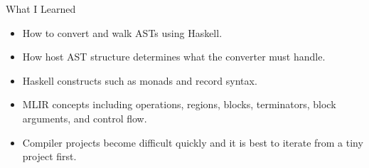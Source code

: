 \documentclass[aspectratio=169,11pt]{beamer}
\begin{document}
\begin{frame}{What I Learned}
	\begin{itemize}
		\item How to convert and walk ASTs using Haskell.
		\item How host AST structure determines what the converter must handle.
		\item Haskell constructs such as monads and record syntax.
		\item MLIR concepts including operations, regions, blocks, terminators, block
		      arguments, and control flow.
		\item Compiler projects become difficult quickly and it is best to iterate from a
		      tiny project first.

	\end{itemize}
\end{frame}
\end{document}
